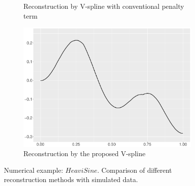\begin{figure}
\begin{subfigure}{0.45\textwidth}
    \caption{Reconstruction by V-spline with conventional penalty term}
    \end{subfigure}
    \begin{subfigure}{0.45\textwidth}
    \centering
    \includegraphics[width=\linewidth,height=0.45\textwidth]{Chapters/02TractorSplineTheory/plot/ggplot/ggHeaviSineTractor.pdf}
    \caption{Reconstruction by the proposed V-spline}
    \end{subfigure}
\caption{Numerical example: $\textit{HeaviSine}$. Comparison of different reconstruction methods with simulated data.}\label{num3}
 \end{figure}

%
%


